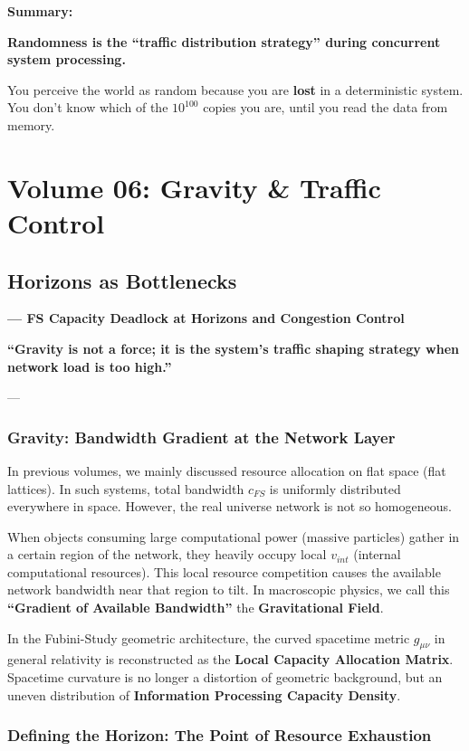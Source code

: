 \documentclass[11pt,a4paper,twoside]{book}
\begin{document}
\textbf{Summary:}

\textbf{Randomness is the ``traffic distribution strategy'' during concurrent system processing.}

You perceive the world as random because you are \textbf{lost} in a deterministic system. You don't know which of the \textbf{$10^{100}$} copies you are, until you read the data from memory.

 
\part{Volume 06: Gravity \& Traffic Control}

\chapter{Horizons as Bottlenecks}

\textbf{--- FS Capacity Deadlock at Horizons and Congestion Control}

\textbf{``Gravity is not a force; it is the system's traffic shaping strategy when network load is too high.''}

---

\section{Gravity: Bandwidth Gradient at the Network Layer}

In previous volumes, we mainly discussed resource allocation on flat space (flat lattices). In such systems, total bandwidth \textbf{$c_{FS}$} is uniformly distributed everywhere in space. However, the real universe network is not so homogeneous.

When objects consuming large computational power (massive particles) gather in a certain region of the network, they heavily occupy local \textbf{$v_{int}$} (internal computational resources). This local resource competition causes the available network bandwidth near that region to tilt. In macroscopic physics, we call this \textbf{``Gradient of Available Bandwidth''} the \textbf{Gravitational Field}.

In the Fubini-Study geometric architecture, the curved spacetime metric \textbf{$g_{\mu\nu}$} in general relativity is reconstructed as the \textbf{Local Capacity Allocation Matrix}. Spacetime curvature is no longer a distortion of geometric background, but an uneven distribution of \textbf{Information Processing Capacity Density}.

\section{Defining the Horizon: The Point of Resource Exhaustion}
\end{document}
